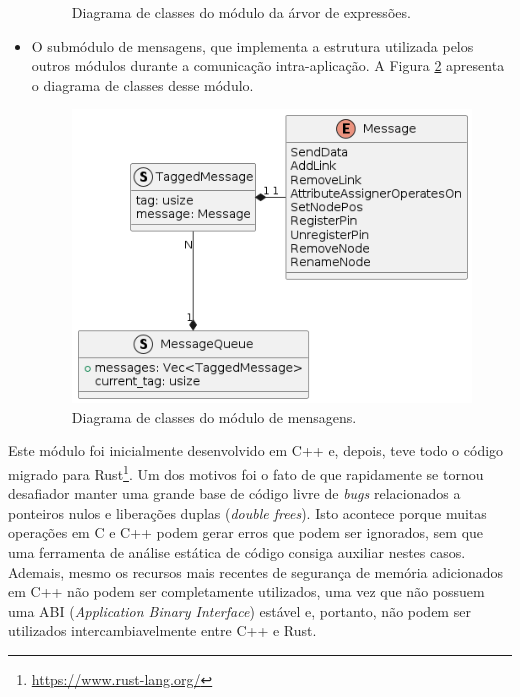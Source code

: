 \documentclass[
	12pt,				%
	openright,			%
	oneside,			%
	a4paper,			%
	main=brazil,
	english,			%
	]{ufsj-abntex2}
\begin{document}
\begin{itemize}
\begin{figure}[h]
        \caption{Diagrama de classes do módulo da árvor de expressões.}
        \label{fig:uml-expr}
    \end{figure}
    \item O submódulo de mensagens, que implementa a estrutura utilizada pelos outros módulos durante a comunicação intra-aplicação. A Figura \ref{fig:uml-msg} apresenta o diagrama de classes desse módulo.
    \begin{figure}[h]
        \centering
        \includegraphics[scale=0.45]{diagrams/img/messages.png} 
        \caption{Diagrama de classes do módulo de mensagens.}
        \label{fig:uml-msg}
    \end{figure}
\end{itemize}

Este módulo foi inicialmente desenvolvido em C++ e, depois, teve todo o código migrado para Rust\footnote{\url{https://www.rust-lang.org/}}. Um dos motivos foi o fato de que rapidamente se tornou desafiador manter uma grande base de código livre de \textit{bugs} relacionados a ponteiros nulos e liberações duplas (\textit{double frees}). Isto acontece porque muitas operações em C e C++ podem gerar erros que podem ser ignorados, sem que uma ferramenta de análise estática de código consiga auxiliar nestes casos. Ademais, mesmo os recursos mais recentes de segurança de memória adicionados em C++ não podem ser completamente utilizados, uma vez que não possuem uma ABI (\textit{Application Binary Interface}) estável e, portanto, não podem ser utilizados intercambiavelmente entre C++ e Rust.
\end{document}
